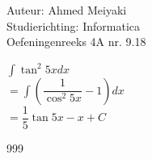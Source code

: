 \documentclass[a4paper]{article}
\begin{document}
  
\noindent \large Auteur: Ahmed Meiyaki \\
\noindent \large Studierichting: Informatica\\
\noindent \large Oefeningenreeks 4A nr. 9.18\\

\medskip

\normalsize

$\displaystyle\int \tan^2 5x dx $\\

$=\displaystyle\int \left(\dfrac{1}{\cos^2 5x} - 1\right) dx $\\

$=\dfrac{1}{5} \tan 5x - x + C $\\

\begin{thebibliography}{999}
\end{thebibliography}
\end{document}
